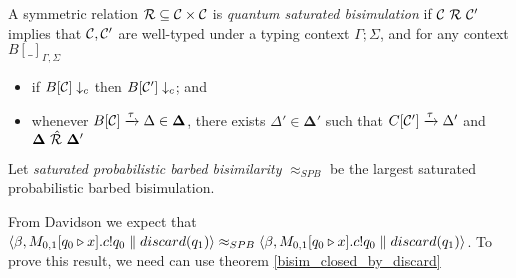 
\begin{definition}
	A symmetric relation $\mathcal{R} \subseteq \mathcal{C} \times \mathcal{C}$ is \emph{quantum saturated bisimulation} if $\mathcal{C}\ \mathcal{R}\ \mathcal{C}'$ implies that $\mathcal{C}, \mathcal{C}'$ are well-typed under a typing context $\Gamma; \Sigma$, and for any context $B[\_]_{\Gamma, \Sigma}$
	\begin{itemize}
		\item if $B[\mathcal{C}] \downarrow_{c}$ then $B[\mathcal{C}'] \downarrow_{c}$; and 
		\item whenever $B[\mathcal{C}] \xrightarrow{\tau} \Delta \in \mathbf{\Delta}$, there exists $\Delta' \in \mathbf{\Delta'}$ such that $C[\mathcal{C}'] \xrightarrow{\tau} \Delta'$ and $\mathbf{\Delta}\ \sqlift{\rel}\ \mathbf{\Delta'}$
	\end{itemize}
	Let \emph{saturated probabilistic barbed bisimilarity} $\approx_{SPB}$ be the largest saturated probabilistic barbed bisimulation.
\end{definition}





From Davidson we expect that $\langle\beta, M_{0,1}[q_0 \triangleright x] . c ! q_0 \parallel discard(q_1)\rangle \approx_{SPB} \langle\beta, M_{0,1}[q_0 \triangleright x] . c ! q_0 \parallel discard(q_1)\rangle$. To prove this result, we need can use theorem \ref{bisim_closed_by_discard}



